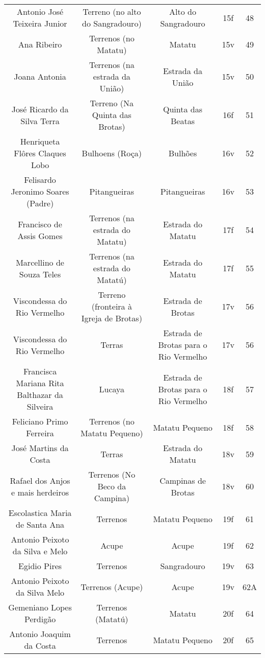 \begin{table}[!htp]
{\begin{tiny}
\begin{tabular}{ccccc}
Antonio José Teixeira Junior							&Terreno (no alto do Sangradouro)	&Alto do Sangradouro			&15f			&48			&\\
Ana Ribeiro									&Terrenos (no Matatu)			&Matatu					&15v			&49			&\\
Joana Antonia									&Terrenos (na estrada da União)		&Estrada da União			&15v			&50			&\\
José Ricardo da Silva Terra							&Terreno (Na Quinta das Brotas)		&Quinta das Beatas			&16f			&51			&\\
Henriqueta Flôres Claques Lobo							&Bulhoens (Roça)			&Bulhões				&16v			&52			&\\
Felisardo Jeronimo Soares (Padre)						&Pitangueiras				&Pitangueiras				&16v			&53			&\\
Francisco de Assis Gomes							&Terrenos (na estrada do Matatu)	&Estrada do Matatu			&17f			&54			&\\
Marcellino de Souza Teles							&Terrenos (na estrada do Matatú)	&Estrada do Matatu			&17f			&55			&\\
Viscondessa do Rio Vermelho							&Terreno (fronteira à Igreja de Brotas)	&Estrada de Brotas			&17v			&56			&\\
Viscondessa do Rio Vermelho 							&Terras					&Estrada de Brotas para o Rio Vermelho	&17v			&56			&\\
Francisca Mariana Rita Balthazar da Silveira					&Lucaya					&Estrada de Brotas para o Rio Vermelho	&18f			&57			&\\
Feliciano Primo Ferreira							&Terrenos (no Matatu Pequeno)		&Matatu Pequeno				&18f			&58			&\\
José Martins da Costa								&Terras					&Estrada do Matatu			&18v			&59			&\\
Rafael dos Anjos e mais herdeiros						&Terrenos (No Beco da Campina)		&Campinas de Brotas			&18v			&60			&\\
Escolastica Maria de Santa Ana							&Terrenos				&Matatu Pequeno				&19f			&61			&\\
Antonio Peixoto da Silva e Melo							&Acupe					&Acupe					&19f			&62			&\\
Egidio Pires									&Terrenos				&Sangradouro				&19v			&63			&\\
Antonio Peixoto da Silva Melo							&Terrenos (Acupe)			&Acupe					&19v			&62A			&\\
Gemeniano Lopes Perdigão							&Terrenos (Matatú)			&Matatu					&20f			&64			&\\
Antonio Joaquim da Costa							&Terrenos				&Matatu Pequeno				&20f			&65			&\\

\end{tabular}
\end{tiny}}
\end{table}
